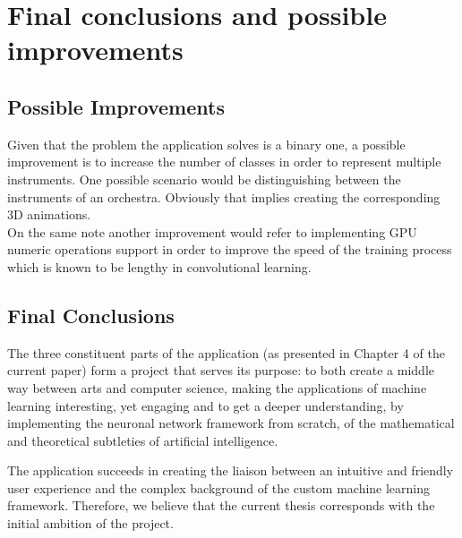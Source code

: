 \chapter*{Final conclusions and possible improvements}
\section*{Possible Improvements}
Given that the problem the application solves is a binary one, a possible improvement is to increase
the number of classes in order to represent multiple instruments.
One possible scenario would be distinguishing between the instruments of an orchestra.
Obviously that implies creating the corresponding 3D animations.\\
On the same note another improvement would refer to implementing GPU numeric operations support in
order to improve the speed of the training process which is known to be lengthy in
convolutional learning.
\section*{Final Conclusions}
The three constituent parts of the application (as presented in Chapter 4 of the current paper) form a project that serves its purpose: to both create a middle way between arts and computer science, making the applications of machine learning interesting, yet engaging and to get  a deeper understanding, by implementing the neuronal network framework from scratch, of the mathematical and theoretical subtleties of artificial intelligence.

		The application succeeds in creating the liaison between an intuitive and friendly user experience and the complex background of the custom machine learning framework. Therefore, we believe that the current thesis corresponds with the initial ambition of the project.
